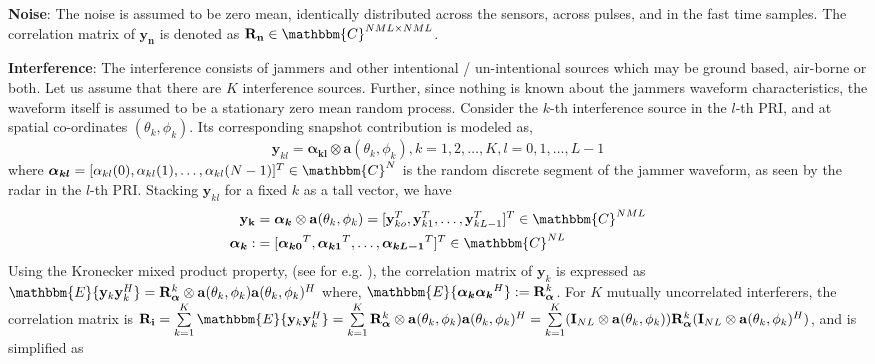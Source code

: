 \documentclass[11pt,draftclsnofoot,onecolumn]{IEEEtran}
\theoremstyle{definition}
\theoremstyle{remark}
\begin{document}
{\bf Noise}: The noise is assumed to be zero mean, identically distributed across the sensors, across pulses, and  in the fast time samples. The correlation matrix of $\mathbf{y_n}$ is denoted as $ \mathbf{R_n}\in\mathbbm{C}^{NML\times NML}$. 

{\bf Interference}: The interference consists of jammers and other intentional / un-intentional sources which may be ground based, air-borne or both. Let us assume that there are $K$ interference sources. Further, since nothing is known about the jammers waveform characteristics, the waveform itself is assumed to be a stationary zero mean random process. Consider the $k$-th interference source in the $l$-th PRI, and at spatial co-ordinates $(\theta_k,\phi_k)$. Its corresponding snapshot contribution is modeled as,
\begin{equation*}
\mathbf{y}_{kl}=\boldsymbol{\alpha_{kl}}\otimes\mathbf{a}(\theta_k,\phi_k),k=1,2,\ldots,K,l=0,1,\ldots,L-1
\end{equation*}
where $\boldsymbol{\alpha_{kl}}=[\alpha_{kl}(0),\alpha_{kl}(1),\ldots,\alpha_{kl}(N-1)]^T\in\mathbbm{C}^{N}$ is the random discrete segment of the jammer waveform, as seen by the radar in the $l$-th PRI. Stacking $\mathbf{y}_{kl}$ for a fixed $k$ as a tall vector, we have 
\begin{align} \label{eq12}
\mathbf{y_k}&=\boldsymbol{\alpha_k}\otimes\mathbf{a}(\theta_k,\phi_k) 
            =[\mathbf{y}_{ko}^T,\mathbf{y}_{k1}^T,\ldots,\mathbf{y}_{kL-1}^T]^T \in\mathbbm{C}^{NML}  \nonumber\\
\boldsymbol{\alpha_k}:&=[\boldsymbol{\alpha_{k0}}^T,\boldsymbol{\alpha_{k1}}^T,\ldots,\boldsymbol{\alpha_{kL-1}}^T]^T \in\mathbbm{C}^{NL} 
\end{align}
Using the Kronecker mixed product property, (see for e.g. \cite{horn1994}), the correlation matrix of $\mathbf{y}_k$ is expressed as 
$\mathbbm{E}\{\mathbf{y}_k\mathbf{y}_k^H \}=\mathbf{R}_{\boldsymbol{\alpha}}^k\otimes \mathbf{a}(\theta_k,\phi_k)\mathbf{a}(\theta_k,\phi_k)^H$
where, $\mathbbm{E}\{ \boldsymbol{\alpha_k} \boldsymbol{\alpha_k}^H\}:=\mathbf{R}_{\boldsymbol{\alpha}}^k$. For $K$ mutually uncorrelated interferers, the correlation matrix is $\mathbf{R_i}=\sum\limits_{k=1}^K\mathbbm{E}\{\mathbf{y}_k\mathbf{y}_k^H \}=\sum\limits_{k=1}^K \mathbf{R}_{\boldsymbol{\alpha}}^k\otimes \mathbf{a}(\theta_k,\phi_k)\mathbf{a}(\theta_k,\phi_k)^H=\sum\limits_{k=1}^K (\mathbf{I}_{NL}\otimes\mathbf{a}(\theta_k,\phi_k))\mathbf{R}_{\boldsymbol{\alpha}}^k(\mathbf{I}_{NL}\otimes\mathbf{a}(\theta_k,\phi_k)^H) $, and is simplified as
\end{document}
